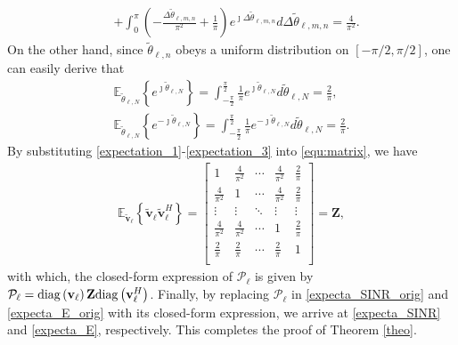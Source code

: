 \documentclass[12pt,draftclsnofoot, onecolumn]{IEEEtran}
\theoremstyle{plain}
\begin{document}
\begin{sloppypar}
\begin{align}
& + \int_{0}^{\pi}\left(-\frac{\Delta\tilde{\theta}_{\ell,m,n}}{\pi^2} + \frac{1}{\pi} \right)e^{\jmath\Delta\tilde{\theta}_{\ell,m,n}}d\Delta\tilde{\theta}_{\ell,m,n} = \frac{4}{\pi^2}. 
\end{align}
On the other hand, since $\tilde{\theta}_{\ell,n}$ obeys a uniform distribution on $[-\pi/2,\pi/2]$, one can easily derive that %
\begin{align}
\mathbb E_{\tilde\theta_{\ell,N}}\left\lbrace e^{\jmath\tilde{\theta}_{\ell,N}}\right\rbrace = \int_{-\frac{\pi}{2}}^{\frac{\pi}{2}}\frac{1}{\pi}e^{\jmath\tilde{\theta}_{\ell,N}}d\tilde{\theta}_{\ell,N} = \frac{2}{\pi}, \label{expectation_2}\\
\mathbb E_{\tilde\theta_{\ell,N}}\left\lbrace e^{-\jmath\tilde{\theta}_{\ell,N}}\right\rbrace = \int_{-\frac{\pi}{2}}^{\frac{\pi}{2}}\frac{1}{\pi}e^{-\jmath\tilde{\theta}_{\ell,N}}d\tilde{\theta}_{\ell,N} = \frac{2}{\pi}. \label{expectation_3} 
\end{align}
By substituting \eqref{expectation_1}-\eqref{expectation_3} into \eqref{equ:matrix}, we have
\begin{align}
\mathbb E_{\tilde{\mathbf v}_\ell}\left\lbrace\tilde{\mathbf v}_\ell\tilde{\mathbf v}_{\ell}^H\right\rbrace = \begin{bmatrix}
1& \frac{4}{\pi^2} & \cdots & \frac{4}{\pi^2} & \frac{2}{\pi} \\
\frac{4}{\pi^2} & 1 & \cdots & \frac{4}{\pi^2}  & \frac{2}{\pi} \\
\vdots & \vdots & \ddots & \vdots & \vdots \\
\frac{4}{\pi^2} & \frac{4}{\pi^2} & \cdots &  1 & \frac{2}{\pi} \\
\frac{2}{\pi} & \frac{2}{\pi} & \cdots & \frac{2}{\pi} & 1 \\
\end{bmatrix} = \mathbf Z,
\end{align}
with which, the closed-form expression of $\mathcal P_\ell$ is given by $\mathcal P_\ell = {\rm diag}\left(\mathbf v_\ell\right)\mathbf Z{\rm diag}\left(\mathbf v_{\ell}^H\right)$. Finally, by replacing $\mathcal P_\ell$ in \eqref{expecta_SINR_orig} and \eqref{expecta_E_orig} with its closed-form expression, we arrive at \eqref{expecta_SINR} and \eqref{expecta_E}, respectively. This completes the proof of Theorem \ref{theo}.  

\vspace{1mm}

\end{sloppypar}
\end{document}

